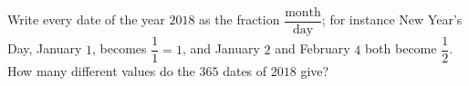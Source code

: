 Write every date of the year $2018$ as the fraction $\dfrac{\text{month}}{\text{day}}$; for instance New Year's Day, January $1$, becomes $\dfrac{1}{1}=1$, and January $2$ and February $4$ both become $\dfrac{1}{2}$. How many different values do the $365$ dates of $2018$ give?
